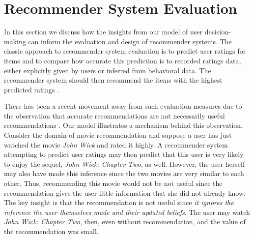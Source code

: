 \documentclass[format=acmsmall, review=false]{acmart}
\begin{document}
\section{Recommender System Evaluation}
In this section we discuss how the insights from our model of user decision-making can inform the evaluation and design of recommender systems. The classic approach to recommender system evaluation is to predict user ratings for items and to compare how accurate this prediction is to recorded ratings data, either explicitly given by users or inferred from behavioral data. The recommender system should then recommend the items with the highest predicted ratings \cite{adomavicius2005toward}.
\par
There has been a recent movement away from such evaluation measures due to the observation that accurate recommendations are not necessarily useful recommendations \cite{mcnee2006being}. Our model illustrates a mechanism behind this observation. Consider the domain of movie recommendation and suppose a user has just watched the movie \textit{John Wick} and rated it highly. A recommender system attempting to predict user ratings may then predict that this user is very likely to enjoy the sequel, \textit{John Wick: Chapter Two}, as well. However, the user herself may also have made this inference since the two movies are very similar to each other. Thus, recommending this movie would not be not useful since the recommendation gives the user little information that she did not already know. The key insight is that the recommendation is not useful since \textit{it ignores the inference the user themselves made and their updated beliefs}. The user may watch \textit{John Wick: Chapter Two}, then, even without recommendation, and the value of the recommendation was small.
\par
\end{document}
